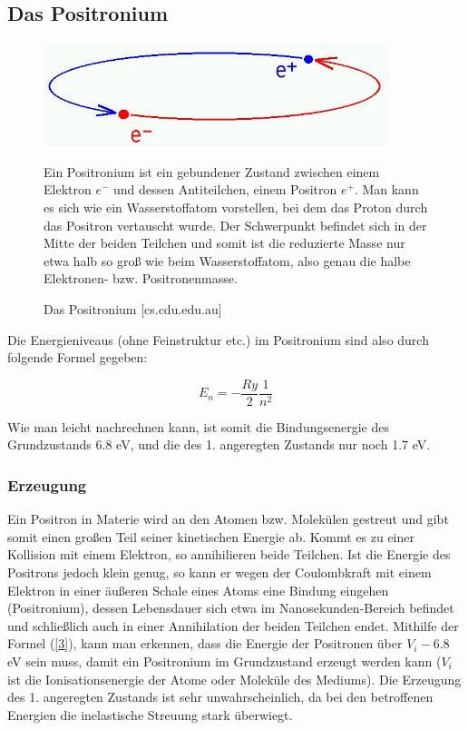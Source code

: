 \subsection{Das Positronium \label{1}}

\begin{figure}[H]
	\begin{minipage}{0.49\textwidth}
	\centering \includegraphics[width=0.9\textwidth]{BilderTheorie/Positronium.png}
	\caption{Das Positronium [cs.cdu.edu.au]}
	\end{minipage}
	\begin{minipage}{0.49\textwidth}
	Ein Positronium ist ein gebundener Zustand zwischen einem Elektron $e^-$ und dessen Antiteilchen, einem Positron $e^+$. Man kann es sich wie ein Wasserstoffatom vorstellen, bei dem das Proton durch das Positron vertauscht wurde. Der Schwerpunkt befindet sich in der Mitte der beiden Teilchen und somit ist die reduzierte Masse nur etwa halb so groß wie beim Wasserstoffatom, also genau die halbe Elektronen- bzw. Positronenmasse.
	\end{minipage}
\end{figure}
Die Energieniveaus (ohne Feinstruktur etc.) im Positronium sind also durch folgende Formel gegeben:

\begin{equation} E_n = -\frac{Ry}{2}\frac{1}{n^2} \label{3} \end{equation}

Wie man leicht nachrechnen kann, ist somit die Bindungsenergie des Grundzustands 6.8 eV, und die des 1. angeregten Zustands nur noch 1.7 eV.

\subsubsection{Erzeugung}

Ein Positron in Materie wird an den Atomen bzw. Molekülen gestreut und gibt somit einen großen Teil seiner kinetischen Energie ab. Kommt es zu einer Kollision mit einem Elektron, so annihilieren beide Teilchen. Ist die Energie des Positrons jedoch klein genug, so kann er wegen der Coulombkraft mit einem Elektron in einer äußeren Schale eines Atoms eine Bindung eingehen (Positronium), dessen Lebensdauer sich etwa im Nanosekunden-Bereich befindet und schließlich auch in einer Annihilation der beiden Teilchen endet. Mithilfe der Formel (\ref{3}), kann man erkennen, dass die Energie der Positronen über $V_i - 6.8$ eV sein muss, damit ein Positronium im Grundzustand erzeugt werden kann ($V_i$ ist die Ionisationsenergie der Atome oder Moleküle des Mediums). Die Erzeugung des 1. angeregten Zustands ist sehr unwahrscheinlich, da bei den betroffenen Energien die inelastische Streuung stark überwiegt. 

